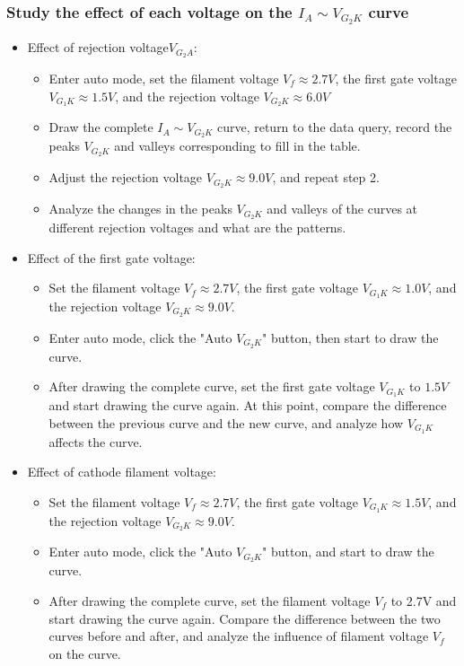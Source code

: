 \documentclass[UTF8]{article}
\begin{document}
    \subsubsection{Study the effect of each voltage on the  $I_A\sim V_{G_2K}$ curve}
    \begin{itemize}
    \item Effect of rejection voltage$V_{G_2A}$:
          \begin{itemize}
          \item Enter auto mode, set the filament voltage $V_f\approx 2.7V$, the first gate voltage $V_{G_1K}\approx 1.5V$, and the rejection voltage $V_{G_2K}\approx 6.0V$
          \item Draw the complete  $I_A\sim V_{G_2K}$ curve, return to the data query, record the peaks $V_{G_2K}$ and valleys corresponding to fill in the table.
          \item Adjust the rejection voltage $V_{G_2K}\approx 9.0V$, and repeat step 2.
          \item Analyze the changes in the peaks $V_{G_2K}$ and valleys of the curves at different rejection voltages and what are the patterns.
          \end{itemize}
    \item Effect of the first gate voltage:
          \begin{itemize}
          \item Set the filament voltage $V_f\approx 2.7V$, the first gate voltage $V_{G_1K}\approx 1.0V$, and the rejection voltage $V_{G_2K}\approx 9.0V$.
          \item Enter auto mode, click the "Auto $V_{G_2K}$" button, then start to draw the curve.
          \item After drawing the complete curve, set the first gate voltage $V_{G_1K}$ to $1.5V$ and start drawing the curve again. At this point, compare the difference between the previous curve and the new curve, and analyze how $V_{G_1K}$ affects the curve.
          \end{itemize}
    \item Effect of cathode filament voltage:
          \begin{itemize}
          \item Set the filament voltage $V_f\approx 2.7V$, the first gate voltage $V_{G_1K}\approx 1.5V$, and the rejection voltage $V_{G_2K}\approx 9.0V$.
          \item Enter auto mode, click the "Auto $V_{G_2K}$" button, and start to draw the curve.
          \item After drawing the complete curve, set the filament voltage $V_f$ to 2.7V and start drawing the curve again. Compare the difference between the two curves before and after, and analyze the influence of filament voltage $V_f$ on the curve.
          \end{itemize}
    \end{itemize}
\end{document}
